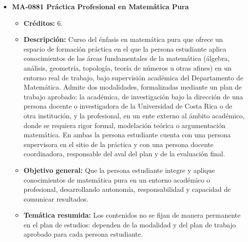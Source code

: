 \begin{itemize}[leftmargin=1.3em, itemsep=10pt, topsep=4pt, label={\color{Azul-UCR}$\blacksquare$}]
\item {\color{Azul-UCR}\textbf{MA-0881 Práctica Profesional en Matemática Pura}}\par\nopagebreak\smallskip
\begin{itemize}[leftmargin=1.1em, itemsep=3pt, topsep=2pt, parsep=2pt, label={\textendash}]
\item \textbf{Créditos:} 6.
\item \textbf{Descripción:} Curso del énfasis en matemática pura que ofrece un espacio de formación práctica en el que la persona estudiante aplica conocimientos de las áreas fundamentales de la matemática (álgebra, análisis, geometría, topología, teoría de números u otras afines) en un entorno real de trabajo, bajo supervisión académica del Departamento de Matemática. Admite dos modalidades, formalizadas mediante un plan de trabajo aprobado: la académica, de investigación bajo la dirección de una persona docente o investigadora de la Universidad de Costa Rica o de otra institución, y la profesional, en un ente externo al ámbito académico, donde se requiera rigor formal, modelación teórica o argumentación matemática. En ambas la persona estudiante cuenta con una persona supervisora en el sitio de la práctica y con una persona docente coordinadora, responsable del aval del plan y de la evaluación final.
\item \textbf{Objetivo general:} Que la persona estudiante integre y aplique conocimientos de matemática pura en un entorno académico o profesional, desarrollando autonomía, responsabilidad y capacidad de comunicar resultados.
\item \textbf{Temática resumida:} Los contenidos no se fijan de manera permanente en el plan de estudios: dependen de la modalidad y del plan de trabajo aprobado para cada persona estudiante.
\end{itemize}


\end{itemize}
